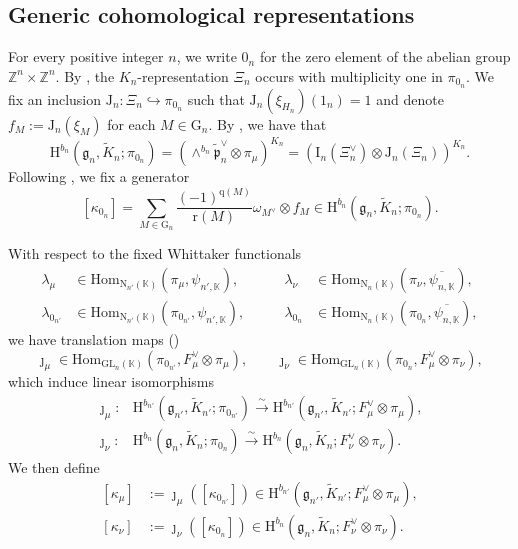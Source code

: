 \documentclass[12pt, a4paper]{amsart}
\newcommand{\RG}{{\mathrm {G}}}
\newcommand{\RH}{{\mathrm {H}}}
\newcommand{\RI}{{\mathrm {I}}}
\newcommand{\RJ}{{\mathrm {J}}}
\newcommand{\RN}{{\mathrm {N}}}
\newcommand{\GL}{{\mathrm{GL}}}
\newcommand{\Z}{\mathbb{Z}}
\newcommand{\K}{\mathbb{K}}
\theoremstyle{Theorem}
\theoremstyle{Theorem}
\theoremstyle{Theorem}
\theoremstyle{Theorem}
\theoremstyle{Plain}
\theoremstyle{Definition}
\begin{document}
	
	
	\subsection{Generic cohomological representations}\label{generic}
	
	For every positive integer $n$, we write $0_n$ for the zero element of the abelian group $\Z^n\times\Z^n$. By \cite[Lemma 4.2]{DX}, the $K_n$-representation $\Xi_n$ occurs with multiplicity one in $\pi_{0_n}$. We fix an inclusion $\RJ_n:\Xi_n\hookrightarrow\pi_{0_n}$ such that $\RJ_n(\xi_{H_n})(1_n)=1$ and denote $f_M:=\RJ_n(\xi_M)$ for each $M\in\RG_n$. By \cite[Proposition 9.4.3]{Wa1}, we have that
	\begin{equation}\label{W1}
		\RH^{b_n}\left(\mathfrak{g}_n,\widetilde{K}_n;\pi_{0_n}\right)=\left(\wedge^{b_n}\widetilde{\mathfrak{p}}^{\vee}_n\otimes\pi_{\mu}\right)^{K_n}=\left(\RI_n(\Xi^{\vee}_n)\otimes\RJ_n(\Xi_n)\right)^{K_n}.
	\end{equation}
	Following \cite[(2.61)]{HMN}, we fix a generator
	\[
	[\kappa_{0_n}]=\sum_{M\in\RG_n}\frac{(-1)^{\mathrm{q}(M)}}{\mathrm{r}(M)}\omega_{M^{\vee}}\otimes f_{M}\in\RH^{b_n}\left(\mathfrak{g}_n,\widetilde{K}_n;\pi_{0_n}\right).
	\]
	
	With respect to the fixed Whittaker functionals
	\[
	\begin{aligned}
		\lambda_{\mu}&\in\mathrm{Hom}_{\RN_{n'}(\K)}(\pi_{\mu},\psi_{n',\K}),&\qquad\lambda_{\nu}&\in\mathrm{Hom}_{\RN_{n}(\K)}(\pi_{\nu},\overline{\psi_{n,\K}}),\\
		\lambda_{0_{n'}}&\in\mathrm{Hom}_{\RN_{n'}(\K)}(\pi_{0_{n'}},\psi_{n',\K}),&\qquad\lambda_{0_n}&\in\mathrm{Hom}_{\RN_{n}(\K)}(\pi_{0_n},\overline{\psi_{n,\K}}),
	\end{aligned}
	\]
	we have translation maps (\cite[Proposition 1.1]{JLSa})
	\[
	\jmath_{\mu}\in\mathrm{Hom}_{\GL_n(\K)}(\pi_{0_{n'}},F_{\mu}^{\vee}\otimes\pi_{\mu}),\qquad
	\jmath_{\nu}\in\mathrm{Hom}_{\GL_n(\K)}(\pi_{0_{n}},F_{\mu}^{\vee}\otimes\pi_{\nu}),
	\]
	which induce linear isomorphisms
	\[
	\begin{aligned}
		\jmath_{\mu}:&\RH^{b_{n'}}\left(\mathfrak{g}_{n'},\widetilde{K}_{n'};\pi_{0_{n'}}\right)\xrightarrow{\sim}\RH^{b_{n'}}\left(\mathfrak{g}_{n'},\widetilde{K}_{n'};F_{\mu}^{\vee}\otimes\pi_{\mu}\right),\\
		\jmath_{\nu}:&\RH^{b_n}\left(\mathfrak{g}_n,\widetilde{K}_n;\pi_{0_n}\right)\xrightarrow{\sim}\RH^{b_n}\left(\mathfrak{g}_n,\widetilde{K}_n;F_{\nu}^{\vee}\otimes\pi_{\nu}\right).
	\end{aligned}
	\]
	We then define
	\[
	\begin{aligned}
		[\kappa_{\mu}]&:=\jmath_{\mu}([\kappa_{0_{n'}}])\in\RH^{b_{n'}}\left(\mathfrak{g}_{n'},\widetilde{K}_{n'};F_{\mu}^{\vee}\otimes\pi_{\mu}\right),\\
		[\kappa_{\nu}]&:=\jmath_{\nu}([\kappa_{0_{n}}])\in\RH^{b_{n}}\left(\mathfrak{g}_{n},\widetilde{K}_{n};F_{\nu}^{\vee}\otimes\pi_{\nu}\right).
	\end{aligned}
	\]
	
\end{document}
